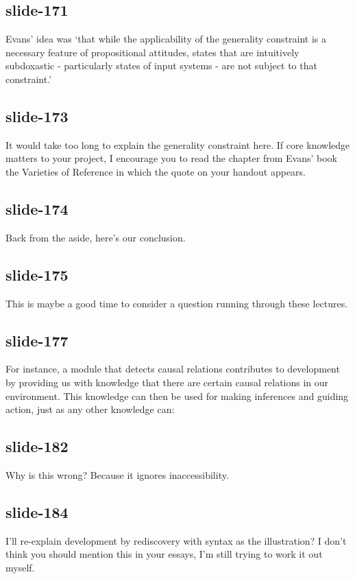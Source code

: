 \documentclass[12pt,\papersize]{extarticle}
\begin{document}
 
\subsection{slide-171}
Evans’ idea was ‘that while the applicability of the generality constraint is a necessary feature of propositional attitudes, states that are intuitively subdoxastic - particularly states of input systems - are not subject to that constraint.’ \citep[p.\ 146]{Davies:1986qv}
 
 
\subsection{slide-173}
It would take too long to explain the generality constraint here. If core knowledge matters to your project, I encourage you to read the chapter from Evans' book the Varieties of Reference in which the quote on your handout appears.
 
 
\subsection{slide-174}
Back from the aside, here's our conclusion.
 
 
\subsection{slide-175}
This is maybe a good time to consider a question running through these lectures.
 
 
\subsection{slide-177}
For instance, a module that detects causal relations contributes to development by providing us with knowledge that there are certain causal relations in our environment.
This knowledge can then be used for making inferences and guiding action, just as any other knowledge can:
 
 
\subsection{slide-182}
Why is this wrong? Because it ignores inaccessibility.
 
 
\subsection{slide-184}
I'll re-explain development by rediscovery with syntax as the illustration?
I don't think you should mention this in your essays, I'm still trying to work it out myself.
 
\end{document}
